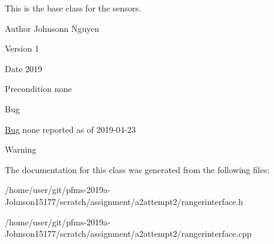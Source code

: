 This is the base class for the sensors.~\newline
\begin{DoxyAuthor}{Author}
Johnsonn Nguyen 
\end{DoxyAuthor}
\begin{DoxyVersion}{Version}
1 
\end{DoxyVersion}
\begin{DoxyDate}{Date}
2019 
\end{DoxyDate}
\begin{DoxyPrecond}{Precondition}
none 
\end{DoxyPrecond}
\begin{DoxyRefDesc}{Bug}
\item[\hyperlink{bug__bug000007}{Bug}]none reported as of 2019-\/04-\/23 \end{DoxyRefDesc}
\begin{DoxyWarning}{Warning}

\end{DoxyWarning}


The documentation for this class was generated from the following files\+:\begin{DoxyCompactItemize}
\item 
/home/user/git/pfms-\/2019a-\/\+Johnson15177/scratch/assignment/a2attempt2/rangerinterface.\+h\item 
/home/user/git/pfms-\/2019a-\/\+Johnson15177/scratch/assignment/a2attempt2/rangerinterface.\+cpp\end{DoxyCompactItemize}
